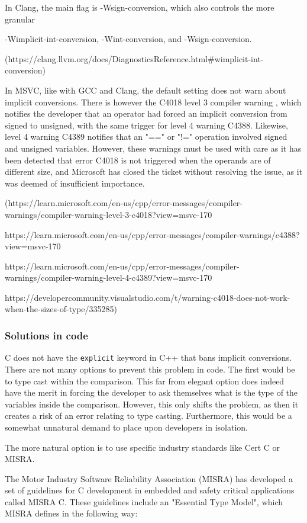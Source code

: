 \documentclass[11pt,letterpaper]{article}
\begin{document}
In Clang, the main flag is -Wsign-conversion, which also controls the more granular

-Wimplicit-int-conversion, -Wint-conversion, and -Wsign-conversion.

(https://clang.llvm.org/docs/DiagnosticsReference.html#wimplicit-int-conversion)

In MSVC, like with GCC and Clang, the default setting does not warn about implicit conversions. There is however the C4018 level 3 compiler warning , which notifies the developer that an operator had forced an implicit conversion from signed to unsigned, with the same trigger for level 4 warning C4388. Likewise, level 4 warning C4389 notifies that an "==" or "!=" operation involved signed and unsigned variables. However, these warnings must be used with care as it has been detected that error C4018 is not triggered when the operands are of different size, and Microsoft has closed the ticket without resolving the issue, as it was deemed of insufficient importance. 

(https://learn.microsoft.com/en-us/cpp/error-messages/compiler-warnings/compiler-warning-level-3-c4018?view=msvc-170

https://learn.microsoft.com/en-us/cpp/error-messages/compiler-warnings/c4388?view=msvc-170

https://learn.microsoft.com/en-us/cpp/error-messages/compiler-warnings/compiler-warning-level-4-c4389?view=msvc-170

https://developercommunity.visualstudio.com/t/warning-c4018-does-not-work-when-the-sizes-of-type/335285)

\subsubsection{Solutions in code}
C does not have the \texttt{explicit} keyword in C++ that bans implicit conversions. There are not many options to prevent this problem in code. The first would be to type cast within the comparison. This far from elegant option does indeed have the merit in  forcing the developer to ask themselves what is the type of the variables inside the comparison. However, this only shifts the problem, as then it creates a risk of an error relating to type casting. Furthermore, this would be a somewhat unnatural demand to place upon developers in isolation. 

The more natural option is to use specific industry standards like Cert C or MISRA.  

The Motor Industry Software Reliability Association (MISRA) has developed a set of guidelines for C development in embedded and safety critical applications called MISRA C. These guidelines include an "Essential Type Model", which MISRA defines in the following 
way:
\end{document}
